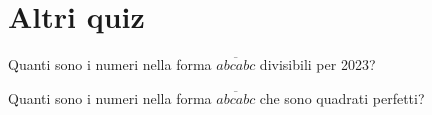 \section{Altri quiz}
\label{sec:quiz_altri}

\begin{esercizio}
    \label{ex:francesco_1}
    Quanti sono i numeri nella forma $\overline{abcabc}$ divisibili per 2023?
\end{esercizio}

\begin{esercizio}
    \label{ex:francesco_2}
    Quanti sono i numeri nella forma $\overline{abcabc}$ che sono quadrati perfetti?
\end{esercizio}